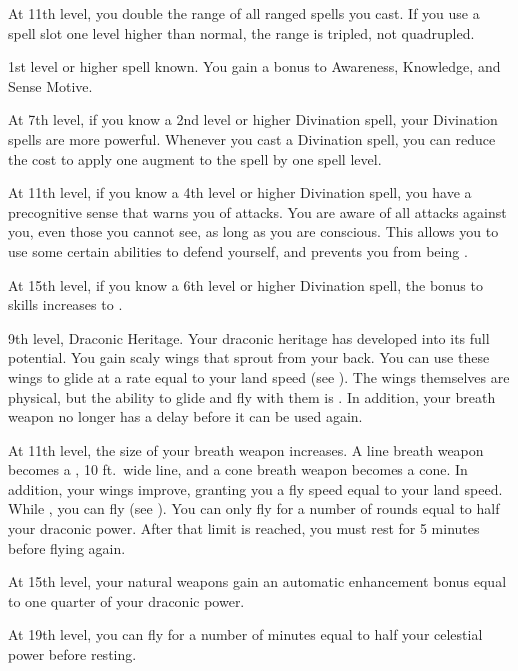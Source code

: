     At 11th level, you double the range of all ranged spells you cast.
    If you use a spell slot one level higher than normal, the range is tripled, not quadrupled.

    \featpre 1st level or higher  spell known.
    \featben You gain a  bonus to Awareness, Knowledge, and Sense Motive.

    At 7th level, if you know a 2nd level or higher Divination spell, your Divination spells are more powerful.
    Whenever you cast a Divination spell, you can reduce the cost to apply one augment to the spell by one spell level.

    At 11th level, if you know a 4th level or higher Divination spell, you have a precognitive sense that warns you of attacks.
    You are aware of all attacks against you, even those you cannot see, as long as you are conscious.
    This allows you to use some certain abilities to defend yourself, and prevents you from being \unaware.

    At 15th level, if you know a 6th level or higher Divination spell, the bonus to skills increases to .

    \featpres 9th level, Draconic Heritage.
    \featben Your draconic heritage has developed into its full potential.
    You gain scaly wings that sprout from your back.
    You can use these wings to glide at a rate equal to your land speed (see ).
    The wings themselves are physical, but the ability to glide and fly with them is .
    In addition, your breath weapon no longer has a delay before it can be used again.

    At 11th level, the size of your breath weapon increases.
    A line breath weapon becomes a \areahuge, 10 ft.\ wide line, and a cone breath weapon becomes a \arealarge cone.
    In addition, your wings improve, granting you a fly speed equal to your land speed.
    While , you can fly (see ).
    You can only fly for a number of rounds equal to half your draconic power.
    After that limit is reached, you must rest for 5 minutes before flying again.

    At 15th level, your natural weapons gain an automatic enhancement bonus equal to one quarter of your draconic power. \magical

    At 19th level, you can fly for a number of minutes equal to half your celestial power before resting. \magical


